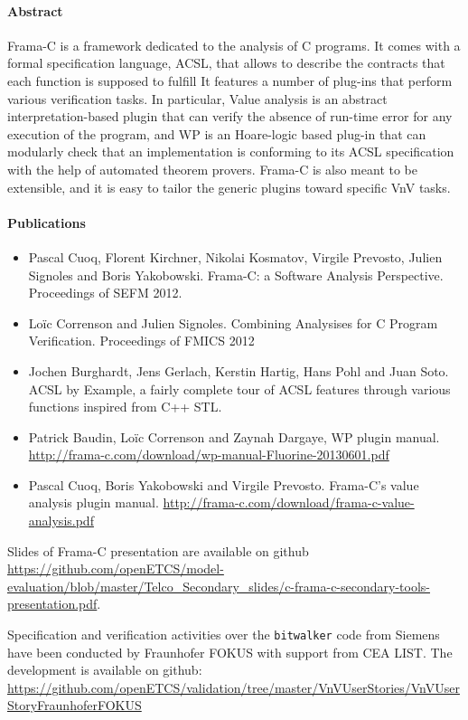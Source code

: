 \paragraph{Abstract}
Frama-C is a framework dedicated to the analysis of C programs. It comes
with a formal specification language, ACSL, that allows to describe the
contracts that each function is supposed to fulfill It features a
number of plug-ins that perform various verification tasks. In particular,
Value analysis is an abstract interpretation-based plugin that can verify the
absence of run-time error for any execution of the program, and WP is an 
Hoare-logic based plug-in that can modularly check that an implementation
is conforming to its ACSL specification with the help of automated theorem
provers. Frama-C is also meant to be extensible, and it is easy to tailor
the generic plugins toward specific VnV tasks.

\paragraph{Publications}

\begin{itemize}
\item Pascal Cuoq, Florent Kirchner, Nikolai Kosmatov, Virgile Prevosto,
  Julien Signoles and Boris Yakobowski. Frama-C: a Software Analysis
  Perspective. Proceedings of SEFM 2012.
\item Loïc Correnson and Julien Signoles. Combining Analysises for
  C Program Verification. Proceedings of FMICS 2012
\item Jochen Burghardt, Jens Gerlach, Kerstin Hartig, Hans Pohl and Juan Soto.
  ACSL by Example, a fairly complete tour of ACSL features through
  various functions inspired from C++ STL.
\item Patrick Baudin, Loïc Correnson and Zaynah Dargaye, WP plugin manual.
\url{http://frama-c.com/download/wp-manual-Fluorine-20130601.pdf}
\item Pascal Cuoq, Boris Yakobowski and Virgile Prevosto.
  Frama-C's value analysis plugin manual. 
  \url{http://frama-c.com/download/frama-c-value-analysis.pdf}
\end{itemize}

Slides of Frama-C presentation are available on github
\url{https://github.com/openETCS/model-evaluation/blob/master/Telco_Secondary_slides/c-frama-c-secondary-tools-presentation.pdf}.

Specification and verification activities over the \texttt{bitwalker} code from
Siemens have been conducted by Fraunhofer FOKUS with support from CEA LIST.
The development is available on github: \url{https://github.com/openETCS/validation/tree/master/VnVUserStories/VnVUserStoryFraunhoferFOKUS}

